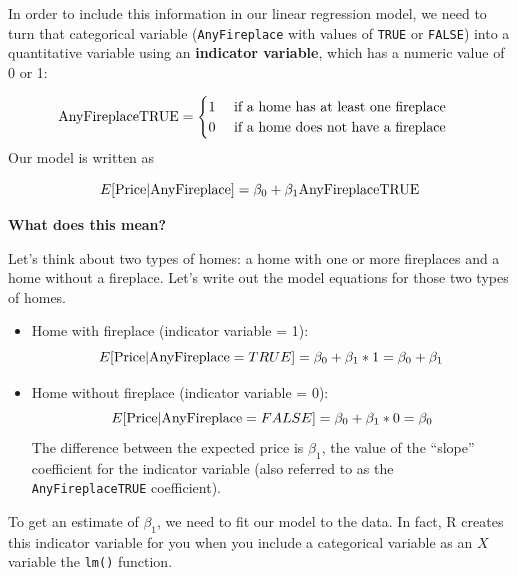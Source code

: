 \documentclass[
]{book}
\newenvironment{Shaded}{\begin{snugshade}}{\end{snugshade}}
\newcommand{\DataTypeTok}[1]{\textcolor[rgb]{0.13,0.29,0.53}{#1}}
\newcommand{\DecValTok}[1]{\textcolor[rgb]{0.00,0.00,0.81}{#1}}
\newcommand{\KeywordTok}[1]{\textcolor[rgb]{0.13,0.29,0.53}{\textbf{#1}}}
\newcommand{\NormalTok}[1]{#1}
\newcommand{\OperatorTok}[1]{\textcolor[rgb]{0.81,0.36,0.00}{\textbf{#1}}}
\newcommand{\StringTok}[1]{\textcolor[rgb]{0.31,0.60,0.02}{#1}}
\begin{document}
\begin{Shaded}
\end{Shaded}

In order to include this information in our linear regression model, we need to turn that categorical variable (\texttt{AnyFireplace} with values of \texttt{TRUE} or \texttt{FALSE}) into a quantitative variable using an \textbf{indicator variable}, which has a numeric value of 0 or 1:

\[ \hbox{AnyFireplaceTRUE} = \begin{cases}1 \quad \text{ if a home has at least one fireplace}\\ 0\quad \text{ if a home does not have a fireplace} \end{cases}\]
Our model is written as

\[E[\hbox{Price} | \hbox{AnyFireplace}] = \beta_0 + \beta_1 \hbox{AnyFireplaceTRUE}\]

\textbf{What does this mean?}

Let's think about two types of homes: a home with one or more fireplaces and a home without a fireplace. Let's write out the model equations for those two types of homes.

\begin{itemize}
\item
  Home with fireplace (indicator variable = 1):\\
  \[E[\hbox{Price} | \hbox{AnyFireplace} = TRUE] = \beta_0 + \beta_1*1 = \beta_0+\beta_1\]
\item
  Home without fireplace (indicator variable = 0):\\
  \[E[\hbox{Price} | \hbox{AnyFireplace} = FALSE] = \beta_0 + \beta_1*0 = \beta_0\]
  The difference between the expected price is \(\beta_1\), the value of the ``slope'' coefficient for the indicator variable (also referred to as the \texttt{AnyFireplaceTRUE} coefficient).
\end{itemize}

To get an estimate of \(\beta_1\), we need to fit our model to the data. In fact, R creates this indicator variable for you when you include a categorical variable as an \(X\) variable the \texttt{lm()} function.
\end{document}
